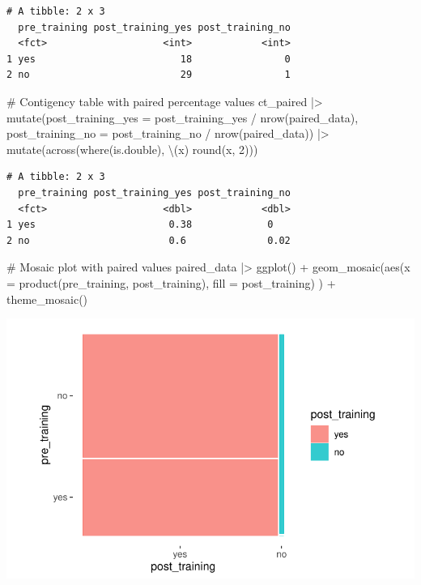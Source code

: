 \documentclass[
  letterpaper,
]{krantz}
\makeatletter
\newenvironment{Shaded}{\begin{snugshade}}{\end{snugshade}}
\newcommand{\AttributeTok}[1]{\textcolor[rgb]{0.40,0.45,0.13}{#1}}
\newcommand{\CommentTok}[1]{\textcolor[rgb]{0.37,0.37,0.37}{#1}}
\newcommand{\DecValTok}[1]{\textcolor[rgb]{0.68,0.00,0.00}{#1}}
\newcommand{\FunctionTok}[1]{\textcolor[rgb]{0.28,0.35,0.67}{#1}}
\newcommand{\NormalTok}[1]{\textcolor[rgb]{0.00,0.23,0.31}{#1}}
\newcommand{\SpecialCharTok}[1]{\textcolor[rgb]{0.37,0.37,0.37}{#1}}
\newenvironment{kframe}{%
\medskip{}
\setlength{\fboxsep}{.8em}
 \def\at@end@of@kframe{}%
 \ifinner\ifhmode%
  \def\at@end@of@kframe{\end{minipage}}%
  \begin{minipage}{\columnwidth}%
 \fi\fi%
 \def\FrameCommand##1{\hskip\@totalleftmargin \hskip-\fboxsep
 \colorbox{shadecolor}{##1}\hskip-\fboxsep
     \hskip-\linewidth \hskip-\@totalleftmargin \hskip\columnwidth}%
 \MakeFramed {\advance\hsize-\width
   \@totalleftmargin\z@ \linewidth\hsize
   \@setminipage}}%
 {\par\unskip\endMakeFramed%
 \at@end@of@kframe}
\renewenvironment{Shaded}{\begin{kframe}}{\end{kframe}}
\makeatother
\begin{document}
\begin{verbatim}
# A tibble: 2 x 3
  pre_training post_training_yes post_training_no
  <fct>                    <int>            <int>
1 yes                         18                0
2 no                          29                1
\end{verbatim}

\begin{Shaded}
\begin{Highlighting}[]
\CommentTok{\# Contigency table with paired percentage values}
\NormalTok{ct\_paired }\SpecialCharTok{|\textgreater{}}
  \FunctionTok{mutate}\NormalTok{(}\AttributeTok{post\_training\_yes =}\NormalTok{ post\_training\_yes }\SpecialCharTok{/} \FunctionTok{nrow}\NormalTok{(paired\_data),}
         \AttributeTok{post\_training\_no =}\NormalTok{ post\_training\_no }\SpecialCharTok{/} \FunctionTok{nrow}\NormalTok{(paired\_data)) }\SpecialCharTok{|\textgreater{}}
  \FunctionTok{mutate}\NormalTok{(}\FunctionTok{across}\NormalTok{(}\FunctionTok{where}\NormalTok{(is.double), \textbackslash{}(x) }\FunctionTok{round}\NormalTok{(x, }\DecValTok{2}\NormalTok{)))}
\end{Highlighting}
\end{Shaded}

\begin{verbatim}
# A tibble: 2 x 3
  pre_training post_training_yes post_training_no
  <fct>                    <dbl>            <dbl>
1 yes                       0.38             0   
2 no                        0.6              0.02
\end{verbatim}

\begin{Shaded}
\begin{Highlighting}[]
\CommentTok{\# Mosaic plot with paired values}
\NormalTok{paired\_data }\SpecialCharTok{|\textgreater{}}
  \FunctionTok{ggplot}\NormalTok{() }\SpecialCharTok{+}
  \FunctionTok{geom\_mosaic}\NormalTok{(}\FunctionTok{aes}\NormalTok{(}\AttributeTok{x =} \FunctionTok{product}\NormalTok{(pre\_training, post\_training),}
                  \AttributeTok{fill =}\NormalTok{ post\_training)}
\NormalTok{              ) }\SpecialCharTok{+}
  \FunctionTok{theme\_mosaic}\NormalTok{()}
\end{Highlighting}
\end{Shaded}

\includegraphics{11_group_comparison_files/figure-pdf/mosaic-plot-paired-pre-post-training-1.pdf}
\end{document}
